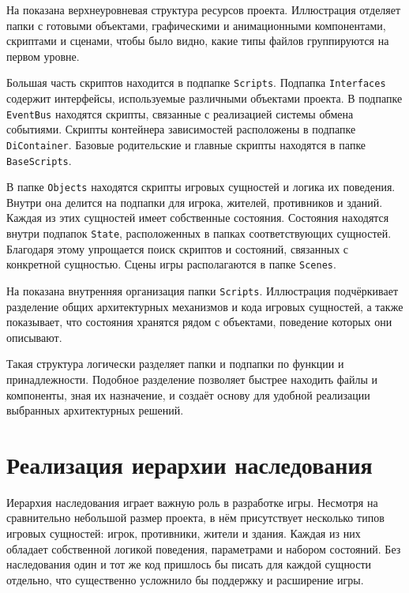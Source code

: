 \documentclass[a4paper,12pt]{report}
\begin{document}
На  показана верхнеуровневая структура ресурсов проекта. Иллюстрация отделяет папки с готовыми объектами, графическими и анимационными компонентами, скриптами и сценами, чтобы было видно, какие типы файлов группируются на первом уровне.


Большая часть скриптов находится в подпапке \texttt{Scripts}. Подпапка \texttt{Interfaces} содержит интерфейсы, используемые различными объектами проекта. В подпапке \texttt{EventBus} находятся скрипты, связанные с реализацией системы обмена событиями. Скрипты контейнера зависимостей расположены в подпапке \texttt{DiContainer}. Базовые родительские и главные скрипты находятся в папке \texttt{BaseScripts}.

В папке \texttt{Objects} находятся скрипты игровых сущностей и логика их поведения. Внутри она делится на подпапки для игрока, жителей, противников и зданий. Каждая из этих сущностей имеет собственные состояния. Состояния находятся внутри подпапок \texttt{State}, расположенных в папках соответствующих сущностей. Благодаря этому упрощается поиск скриптов и состояний, связанных с конкретной сущностью. Сцены игры располагаются в папке \texttt{Scenes}.

На  показана внутренняя организация папки \texttt{Scripts}. Иллюстрация подчёркивает разделение общих архитектурных механизмов и кода игровых сущностей, а также показывает, что состояния хранятся рядом с объектами, поведение которых они описывают.


Такая структура логически разделяет папки и подпапки по функции и принадлежности. Подобное разделение позволяет быстрее находить файлы и компоненты, зная их назначение, и создаёт основу для удобной реализации выбранных архитектурных решений.

\section{Реализация иерархии наследования}

Иерархия наследования играет важную роль в разработке игры. Несмотря на сравнительно небольшой размер проекта, в нём присутствует несколько типов игровых сущностей: игрок, противники, жители и здания. Каждая из них обладает собственной логикой поведения, параметрами и набором состояний. Без наследования один и тот же код пришлось бы писать для каждой сущности отдельно, что существенно усложнило бы поддержку и расширение игры.
\end{document}
